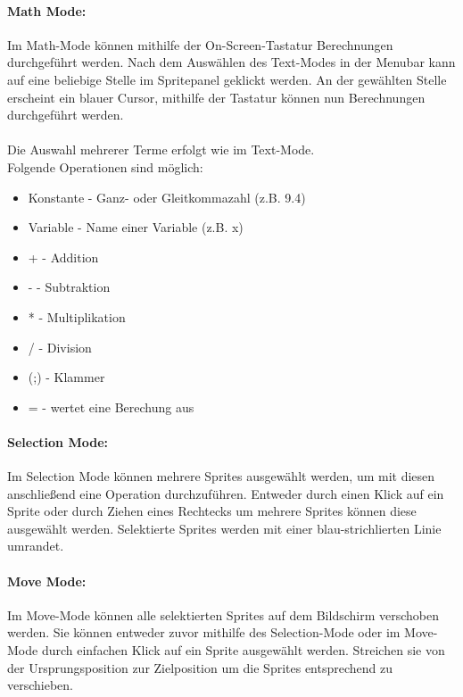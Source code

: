\paragraph{Math Mode:}

Im Math-Mode können mithilfe der On-Screen-Tastatur Berechnungen durchgeführt werden. Nach dem Auswählen des Text-Modes in der Menubar kann auf eine beliebige Stelle im Spritepanel geklickt werden. An der gewählten Stelle erscheint ein blauer Cursor, mithilfe der Tastatur können nun Berechnungen durchgeführt werden.\\
\\
Die Auswahl mehrerer Terme erfolgt wie im Text-Mode.
\\
Folgende Operationen sind möglich:

\begin{itemize}
	\item Konstante - Ganz- oder Gleitkommazahl (z.B. 9.4)
	\item Variable - Name einer Variable (z.B. x)
	\item + - Addition
	\item - - Subtraktion
	\item * - Multiplikation
	\item / - Division
	\item (;) - Klammer
	\item = - wertet eine Berechung aus
\end{itemize}

\paragraph{Selection Mode:}

Im Selection Mode können mehrere Sprites ausgewählt werden, um mit diesen anschließend eine Operation durchzuführen. Entweder durch einen Klick auf ein Sprite oder durch Ziehen eines Rechtecks um mehrere Sprites können diese ausgewählt werden. Selektierte Sprites werden mit einer blau-strichlierten Linie umrandet.

\paragraph{Move Mode:}

Im Move-Mode können alle selektierten Sprites auf dem Bildschirm verschoben werden. Sie können entweder zuvor mithilfe des Selection-Mode oder im Move-Mode durch einfachen Klick auf ein Sprite ausgewählt werden. Streichen sie von der Ursprungsposition zur Zielposition um die Sprites entsprechend zu verschieben.

